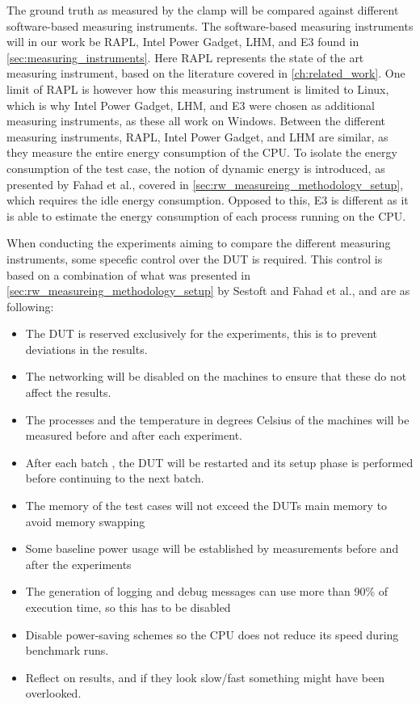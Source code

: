 The ground truth as measured by the clamp will be compared against different software-based measuring instruments. The software-based measuring instruments will in our work be RAPL, Intel Power Gadget, LHM, and E3 found in \cref{sec:measuring_instruments}. Here RAPL represents the state of the art measuring instrument, based on the literature covered in \cref{ch:related_work}. One limit of RAPL is however how this measuring instrument is limited to Linux, which is why Intel Power Gadget, LHM, and E3 were chosen as additional measuring instruments, as these all work on Windows. Between the different measuring instruments, RAPL, Intel Power Gadget, and LHM are similar, as they measure the entire energy consumption of the CPU. To isolate the energy consumption of the test case, the notion of dynamic energy is introduced, as presented by Fahad et al.\cite{fahad2019comparative}, covered in \cref{sec:rw_measureing_methodology_setup}, which requires the idle energy consumption. Opposed to this, E3 is different as it is able to estimate the energy consumption of each process running on the CPU.\newline

When conducting the experiments aiming to compare the different measuring instruments, some specefic control over the DUT is required. This control is based on a combination of what was presented in \cref{sec:rw_measureing_methodology_setup} by Sestoft\cite[]{sestoft2013microbenchmarks} and Fahad et al.\cite[]{fahad2019comparative}, and are as following:

\begin{itemize}
    \item The DUT is reserved exclusively for the experiments, this is to prevent deviations in the results.
    \item The networking will be disabled on the machines to ensure that these do not affect the results.
    \item The processes and the temperature in degrees Celsius of the machines will be measured before and after each experiment.
    \item After each batch , the DUT will be restarted and its setup phase is performed before continuing to the next batch.
    \item The memory of the test cases will not exceed the DUTs main memory to avoid memory swapping
    \item Some baseline power usage will be established by measurements before and after the experiments
    \item The generation of logging and debug messages can use more than 90\% of execution time, so this has to be disabled
    \item Disable power-saving schemes so the CPU does not reduce its speed during benchmark runs.
    \item Reflect on results, and if they look slow/fast something might have been overlooked.
\end{itemize}


